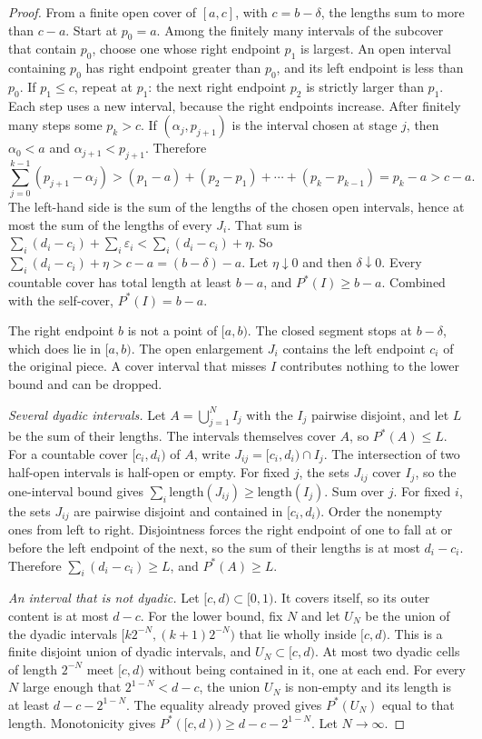 \begin{proof}
From a finite open cover of $[a,c]$, with $c=b-\delta$, the lengths sum to more than $c-a$. Start at $p_0=a$. Among the finitely many intervals of the subcover that contain $p_0$, choose one whose right endpoint $p_1$ is largest. An open interval containing $p_0$ has right endpoint greater than $p_0$, and its left endpoint is less than $p_0$. If $p_1\le c$, repeat at $p_1$: the next right endpoint $p_2$ is strictly larger than $p_1$. Each step uses a new interval, because the right endpoints increase. After finitely many steps some $p_k>c$. If $(\alpha_j,p_{j+1})$ is the interval chosen at stage $j$, then $\alpha_0<a$ and $\alpha_{j+1}<p_{j+1}$. Therefore
\[
 \sum_{j=0}^{k-1}(p_{j+1}-\alpha_j)
 >(p_1-a)+(p_2-p_1)+\cdots+(p_k-p_{k-1})
 =p_k-a>c-a.
\]
The left-hand side is the sum of the lengths of the chosen open intervals, hence at most the sum of the lengths of every $J_i$. That sum is $\sum_i(d_i-c_i)+\sum_i\varepsilon_i<\sum_i(d_i-c_i)+\eta$. So $\sum_i(d_i-c_i)+\eta>c-a=(b-\delta)-a$. Let $\eta\downarrow0$ and then $\delta\downarrow0$. Every countable cover has total length at least $b-a$, and $P^*(I)\ge b-a$. Combined with the self-cover, $P^*(I)=b-a$.

The right endpoint $b$ is not a point of $[a,b)$. The closed segment stops at $b-\delta$, which does lie in $[a,b)$. The open enlargement $J_i$ contains the left endpoint $c_i$ of the original piece. A cover interval that misses $I$ contributes nothing to the lower bound and can be dropped.

\emph{Several dyadic intervals.} Let $A=\bigcup_{j=1}^N I_j$ with the $I_j$ pairwise disjoint, and let $L$ be the sum of their lengths. The intervals themselves cover $A$, so $P^*(A)\le L$. For a countable cover $[c_i,d_i)$ of $A$, write $J_{ij}=[c_i,d_i)\cap I_j$. The intersection of two half-open intervals is half-open or empty. For fixed $j$, the sets $J_{ij}$ cover $I_j$, so the one-interval bound gives $\sum_i\mathrm{length}(J_{ij})\ge\mathrm{length}(I_j)$. Sum over $j$. For fixed $i$, the sets $J_{ij}$ are pairwise disjoint and contained in $[c_i,d_i)$. Order the nonempty ones from left to right. Disjointness forces the right endpoint of one to fall at or before the left endpoint of the next, so the sum of their lengths is at most $d_i-c_i$. Therefore $\sum_i(d_i-c_i)\ge L$, and $P^*(A)\ge L$.

\emph{An interval that is not dyadic.} Let $[c,d)\subset[0,1)$. It covers itself, so its outer content is at most $d-c$. For the lower bound, fix $N$ and let $U_N$ be the union of the dyadic intervals $[k2^{-N},(k+1)2^{-N})$ that lie wholly inside $[c,d)$. This is a finite disjoint union of dyadic intervals, and $U_N\subset[c,d)$. At most two dyadic cells of length $2^{-N}$ meet $[c,d)$ without being contained in it, one at each end. For every $N$ large enough that $2^{1-N}<d-c$, the union $U_N$ is non-empty and its length is at least $d-c-2^{1-N}$. The equality already proved gives $P^*(U_N)$ equal to that length. Monotonicity gives $P^*([c,d))\ge d-c-2^{1-N}$. Let $N\to\infty$.


\end{proof}
